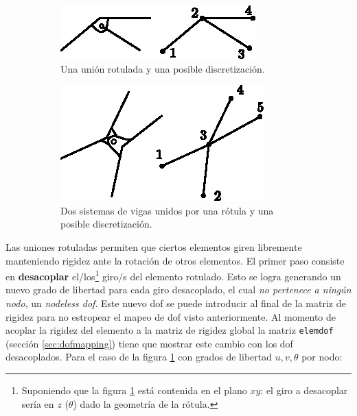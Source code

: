 \begin{figure}[htb!]
	\centering
	\begin{subfigure}{0.49\textwidth}
		\includegraphics[width=\linewidth]{fig/rotulaexample.eps}
		\caption{Una unión rotulada y una posible discretización.}
		\label{fig:rotulaexample}
	\end{subfigure}
		\begin{subfigure}{0.49\textwidth}
	\includegraphics[width=\linewidth]{fig/rotulaexample2.eps}
	\caption{Dos sistemas de vigas unidos por una rótula y una posible discretización.}
	\label{fig:rotulaexample2}
	\end{subfigure}
    \caption{}
\end{figure}



Las uniones rotuladas permiten que ciertos elementos giren libremente manteniendo rigidez ante la rotación de otros elementos. El primer paso consiste en \textbf{desacoplar} el/los\footnote{Suponiendo que la figura \ref{fig:rotulaexample} está contenida en el plano $xy$: el giro a desacoplar sería en $z$ ($\theta$) dado la geometría de la rótula.} giro/s del elemento rotulado. Esto se logra generando un nuevo grado de libertad para cada giro desacoplado, el cual \textit{no pertenece a ningún nodo}, un \textit{nodeless dof}. Este nuevo dof se puede introducir al final de la matriz de rigidez para no estropear el mapeo de dof visto anteriormente. Al momento de acoplar la rigidez del elemento a la matriz de rigidez global la matriz \texttt{elemdof} (sección \ref{sec:dofmapping}) tiene que mostrar este cambio con los dof desacoplados. Para el caso de la figura \ref{fig:rotulaexample} con grados de libertad $u,v,\theta$ por nodo:

